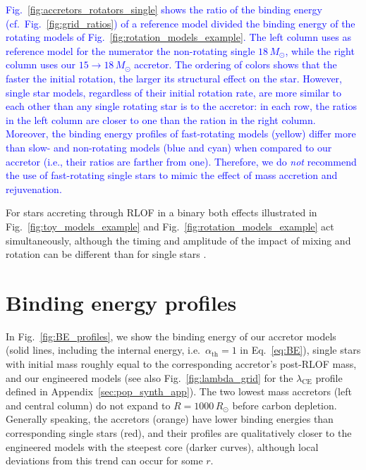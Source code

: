 \documentclass[twocolumn,twocolappendix,trackchanges]{aastex63}
\DeclareRobustCommand{\Eqref}[1]{Eq.~\ref{#1}}
\DeclareRobustCommand{\Figref}[1]{Fig.~\ref{#1}}
\begin{document}
\textcolor{blue}{\Figref{fig:accretors_rotators_single} shows the
  ratio of the binding energy (cf.~\Figref{fig:grid_ratios}) of a
  reference model divided the binding energy of the rotating models of
  \Figref{fig:rotation_models_example}. The left column uses as
  reference model for the numerator the non-rotating single
  $18\,M_\odot$, while the right column uses our
  $15\rightarrow18\,M_\odot$ accretor. The ordering of colors shows
  that the faster the initial rotation, the larger its structural
  effect on the star. However, single star models, regardless of their
  initial rotation rate, are more similar to each other than any
  single rotating star is to the accretor: in each row, the
  ratios in the left column are closer to one than the ration in the
  right column.  Moreover, the binding energy profiles of
  fast-rotating models (yellow) differ more than slow- and
  non-rotating models (blue and cyan) when compared to our accretor
  (i.e., their ratios are farther from one). Therefore, we do
  \emph{not} recommend the use of fast-rotating single stars to mimic
  the effect of mass accretion and rejuvenation.}

For stars accreting through RLOF in a binary both
effects illustrated in \Figref{fig:toy_models_example} and
\Figref{fig:rotation_models_example} act simultaneously, although the
timing and amplitude of the impact of mixing and rotation can be
different than for single stars \citep[e.g.,][]{renzo:2021zoph}.


\section{Binding energy profiles}
\label{sec:BE}

In \Figref{fig:BE_profiles}, we show the binding energy of our
accretor models (solid lines,
including the internal energy, i.e.\ $\alpha_\mathrm{th}=1$ in
\Eqref{eq:BE}),
single stars with initial mass roughly equal
to the corresponding accretor's post-RLOF mass, and our engineered models (see also
\Figref{fig:lambda_grid} for the $\lambda_\mathrm{CE}$ profile defined in Appendix~\ref{sec:pop_synth_app}). The two
lowest mass accretors (left and central column) do not expand to
$R=1000\, R_\odot$ before carbon depletion. Generally speaking, the
accretors (orange) have lower binding energies than corresponding
single stars (red), and their profiles are qualitatively closer to the
engineered models with the steepest core (darker curves), although
local deviations from this trend can occur for some $r$.
\end{document}
